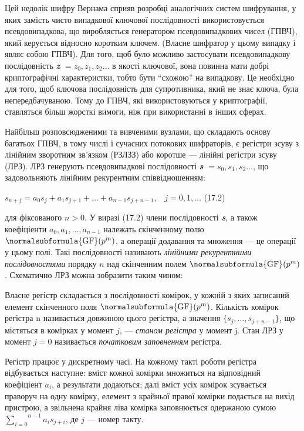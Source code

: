 Цей недолік шифру Вернама сприяв розробці аналогічних систем шифрування, у яких
замість чисто випадкової ключової послідовності використовується
псевдовипадкова, що виробляється генератором псевдовипадкових чисел (ГПВЧ),
який керується відносно коротким ключем. (Власне шифратор у цьому випадку і
являє собою ГПВЧ). Для того, щоб було можливо застосувати псевдовипадкову
послідовність \textbf{\textit{z}}
$=z_{0},z_{1},z_2\dots$ в якості ключової, вона
повинна мати добрі криптографічні характеристки, тобто бути “схожою” на
випадкову. Це необхідно для того, щоб ключова послідовність для супротивника,
який не знає ключа, була непередбачуваною. Тому до ГПВЧ, які використовуються у
криптографії, ставляться більш жорсткі вимоги, ніж при використанні в інших
сферах. 

Найбільш розповсюдженими та вивченими вузлами, що складають основу багатьох
ГПВЧ, в тому числі і сучасних потокових шифраторів, є регістри зсуву з лінійним
зворотним зв’язком (РЗЛЗЗ) або коротше --- лінійні регістри зсуву (ЛРЗ). ЛРЗ
генерують псевдовипадкові послідовності \textbf{\textit{s}}
$=s_{0},s_{1},s_2\dots$, що задовольняють лінійним
рекурентним співвідношенням:

{\raggedleft

$s_{n+j}=a_{0}s_{j}+a_1s_{j+1}+\dots+a_{n-1}s_{j+n-1},\;\;\;j=0,1,\dots$
 (17.2)
\par}

для фіксованого  $n>0$. У виразі (17\textcolor{red}{.}2) члени послідовності
\textbf{\textit{s}}, а також коефіціенти 
$a_{0},a_1,\dots,a_{n-1}$ належать скінченному
полю  $\normalsubformula{\text{GF}}(p^m)$, а операції додавання та
множення --- це операції у цьому полі. Такі послідовності називають
\textit{лінійними рекурентними послідовностями} порядку  $n$ над скінченним
полем  $\normalsubformula{\text{GF}}(p^m)$. Схематично ЛРЗ можна
зобразити таким чином:

{\par}


\bigskip

Власне регістр складається з послідовності комірок, у кожній з яких записаний
елемент скінченного поля  $\normalsubformula{\text{GF}}(p^m)$. Кількість
комірок регістра n називається довжиною цього регістра, а значення 
$\{s_j,\dots,s_{j+n-1}\}$, що містяться в комірках у
момент  $j$, ---  \textit{станом регістра} у момент j. Стан ЛРЗ у момент 
$j=0$ називається \textit{початковим заповненням}\textbf{ }регістра.

Регістр працює у дискретному часі. На кожному такті роботи регістра відбувається
наступне: вміст кожної комірки множиться на відповідний коефіціент 
$a_i$, а результати додаються; далі вміст усіх комірок зсувається
праворуч на одну комірку, елемент з крайньої правої комірки подається на вихід
пристрою, а звільнена крайня ліва комірка заповнюється одержаною сумою 
$\overset{n-1}{\underset{i=0}{\sum }}{a_is_{j+i}}$, де  $j$ ---
номер такту.

